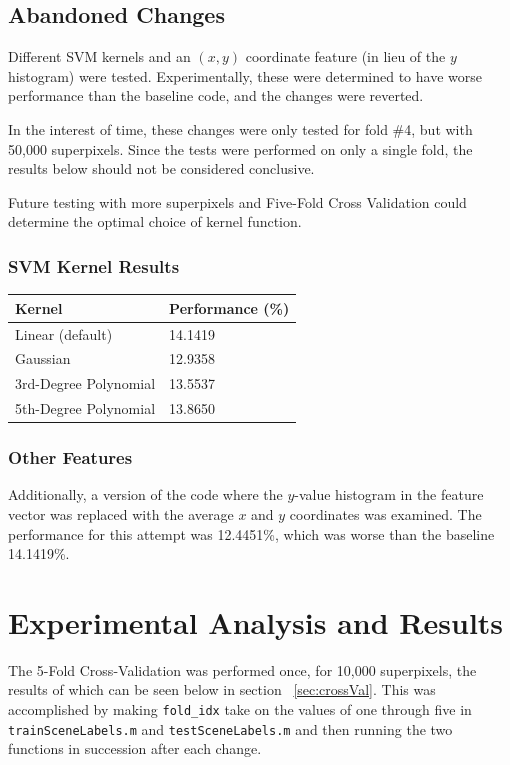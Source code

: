 \documentclass[10pt,twocolumn,letterpaper]{article}
\begin{document}
\subsection{Abandoned Changes}

Different SVM kernels and an $(x,y)$ coordinate feature (in lieu of the $y$ histogram) were tested. Experimentally, these were determined to have worse performance than the baseline code, and the changes were reverted.

In the interest of time, these changes were only tested for fold \#4, but with 50,000 superpixels. Since the tests were performed on only a single fold, the results below should not be considered conclusive.

Future testing with more superpixels and Five-Fold Cross Validation could determine the optimal choice of kernel function.

\subsubsection{SVM Kernel Results}

\begin{center}
  \begin{tabular}{ l | l }
  	\textbf{Kernel} & \textbf{Performance (\%)}\\
    \hline
    Linear (default) & 14.1419 \\ \hline
    Gaussian & 12.9358 \\ \hline
    3rd-Degree Polynomial & 13.5537  \\ \hline
    5th-Degree Polynomial & 13.8650  \\
    \hline
  \end{tabular}
\end{center}

\subsubsection{Other Features}
Additionally, a version of the code where the $y$-value histogram in the feature vector was replaced with the average $x$ and $y$ coordinates was examined.  The performance for this attempt was 12.4451\%, which was worse than the baseline 14.1419\%.

\section{Experimental Analysis and Results}

The 5-Fold Cross-Validation was performed once, for 10,000 superpixels, the results of which can be seen below in section ~\ref{sec:crossVal}.  This was accomplished by making \texttt{fold\_idx} take on the values of one through five in \texttt{trainSceneLabels.m} and \texttt{testSceneLabels.m} and then running the two functions in succession after each change.
\end{document}
